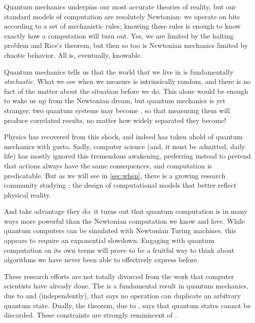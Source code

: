 Quantum mechanics underpins our most accurate theories of
reality,\footnotemark{} but our standard models of computation are resolutely
Newtonian: we operate on bits according to a set of mechanistic rules; knowing
these rules is enough to know exactly how a computation will turn out.  Yes, we
are limited by the halting problem and Rice's theorem, but then so too is
Newtonian mechanics limited by chaotic behavior.  All is, eventually, knowable.


Quantum mechanics tells us that the world that we live in is fundamentally
\emph{stochastic}.  What we see when we measure is intrinsically random, and
there is no fact of the matter about the situation before we do.\footnotemark{}
This alone would be enough to wake us up from the Newtonian dream, but quantum
mechanics is yet stranger: two quantum systems may become , so
that measuring them will produce correlated results, no matter how widely
separated they become!


Physics has recovered from this shock, and indeed has taken ahold of quantum
mechanics with gusto.  Sadly, computer science (and, it must be admitted, daily
life) has mostly ignored this tremendous awakening, preferring instead to
pretend that actions always have the same consequences, and
computation is predicatable.  
But as we will see in \cref{sec:when}, there is a growing research community studying
: the design of computational models that better reflect
physical reality.

And take advantage they do: it turns out that quantum computation is in many ways more
powerful than the Newtonian computation we know and love.  While quantum
computers can be simulated with Newtonian Turing machines, this appears to
require an exponential slowdown.  Engaging with quantum computation
on its own terms will prove to be a fruitful way to think about
algorithms we have never been able to effectively express before.

These research efforts are not totally divorced from the work that computer
scientists have already done.  The  is a fundamental
result in quantum mechanics, due to \citet{wootters1982single} and
\citet{dieks1982communication} (independently), that says no operation can
duplicate an arbitrary quantum state.  Dually, the  theorem,
due to \citet{pati2000impossibility}, says that quantum states cannot be discarded.  These
constraints are strongly reminiscent of .

